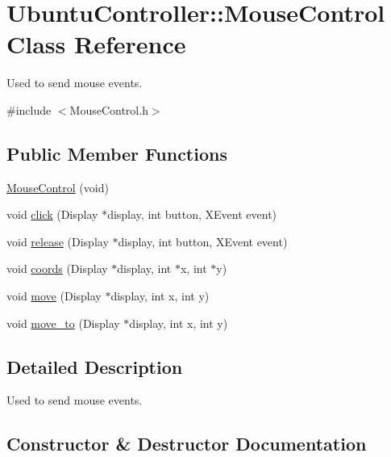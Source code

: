 \hypertarget{classUbuntuController_1_1MouseControl}{}\section{Ubuntu\+Controller\+:\+:Mouse\+Control Class Reference}
\label{classUbuntuController_1_1MouseControl}


Used to send mouse events.  




{\ttfamily \#include $<$Mouse\+Control.\+h$>$}

\subsection*{Public Member Functions}
\begin{DoxyCompactItemize}
\item 
\hyperlink{classUbuntuController_1_1MouseControl_a16de792a08f8e9bbcb656ba0e434507c}{Mouse\+Control} (void)
\item 
void \hyperlink{classUbuntuController_1_1MouseControl_aef7670a46bf01b4a10767a9942dbdb79}{click} (Display $\ast$display, int button, X\+Event event)
\item 
void \hyperlink{classUbuntuController_1_1MouseControl_a0b2111e195e98133385cd559972fa779}{release} (Display $\ast$display, int button, X\+Event event)
\item 
void \hyperlink{classUbuntuController_1_1MouseControl_af69eee658d62f741ab71aa87fbfb75fc}{coords} (Display $\ast$display, int $\ast$x, int $\ast$y)
\item 
void \hyperlink{classUbuntuController_1_1MouseControl_a73a5e37468d8c1e7be8bcd1ac15c2135}{move} (Display $\ast$display, int x, int y)
\item 
void \hyperlink{classUbuntuController_1_1MouseControl_a067b9b5aab08ad63fef9dce22b45763f}{move\+\_\+to} (Display $\ast$display, int x, int y)
\end{DoxyCompactItemize}


\subsection{Detailed Description}
Used to send mouse events. 

\subsection{Constructor \& Destructor Documentation}
\mbox{\label{classUbuntuController_1_1MouseControl_a16de792a08f8e9bbcb656ba0e434507c}} 
